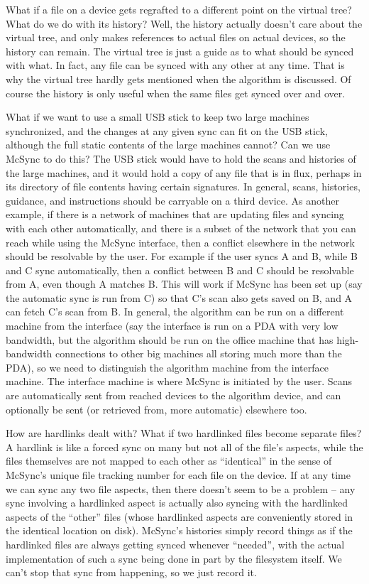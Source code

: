 \documentclass{book}
\begin{document}
What if a file on a device gets regrafted to a different point on the virtual tree?  What do we do with its history?  Well, the history actually doesn't care about the virtual tree, and only makes references to actual files on actual devices, so the history can remain.  The virtual tree is just a guide as to what should be synced with what.  In fact, any file can be synced with any other at any time.  That is why the virtual tree hardly gets mentioned when the algorithm is discussed.  Of course the history is only useful when the same files get synced over and over.

What if we want to use a small USB stick to keep two large machines synchronized, and the changes at any given sync can fit on the USB stick, although the full static contents of the large machines cannot?  Can we use McSync to do this?  The USB stick would have to hold the scans and histories of the large machines, and it would hold a copy of any file that is in flux, perhaps in its directory of file contents having certain signatures.  In general, scans, histories, guidance, and instructions should be carryable on a third device.  As another example, if there is a network of machines that are updating files and syncing with each other automatically, and there is a subset of the network that you can reach while using the McSync interface, then a conflict elsewhere in the network should be resolvable by the user.  For example if the user syncs A and B, while B and C sync automatically, then a conflict between B and C should be resolvable from A, even though A matches B.  This will work if McSync has been set up (say the automatic sync is run from C) so that C's scan also gets saved on B, and A can fetch C's scan from B.  In general, the algorithm can be run on a different machine from the interface (say the interface is run on a PDA with very low bandwidth, but the algorithm should be run on the office machine that has high-bandwidth connections to other big machines all storing much more than the PDA), so we need to distinguish the algorithm machine from the interface machine.  The interface machine is where McSync is initiated by the user.  Scans are automatically sent from reached devices to the algorithm device, and can optionally be sent (or retrieved from, more automatic) elsewhere too.

How are hardlinks dealt with?  What if two hardlinked files become separate files?  A hardlink is like a forced sync on many but not all of the file's aspects, while the files themselves are not mapped to each other as ``identical'' in the sense of McSync's unique file tracking number for each file on the device.  If at any time we can sync any two file aspects, then there doesn't seem to be a problem -- any sync involving a hardlinked aspect is actually also syncing with the hardlinked aspects of the ``other'' files (whose hardlinked aspects are conveniently stored in the identical location on disk).  McSync's histories simply record things as if the hardlinked files are always getting synced whenever ``needed'', with the actual implementation of such a sync being done in part by the filesystem itself.  We can't stop that sync from happening, so we just record it.
\end{document}
